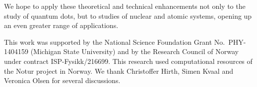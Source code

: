 We hope to apply these theoretical and technical enhancements not only to the study of quantum dots, but to studies of nuclear and atomic systems, opening up an even greater range of applications.

\begin{acknowledgments}
  This work was supported by the National Science Foundation Grant No.\ PHY-1404159 (Michigan State University) and by the Research Council of Norway under contract ISP-Fysikk/216699.  This research used computational resources of the Notur project in Norway.  We thank Christoffer Hirth, Simen Kvaal and Veronica Olsen for several discussions.
\end{acknowledgments}




